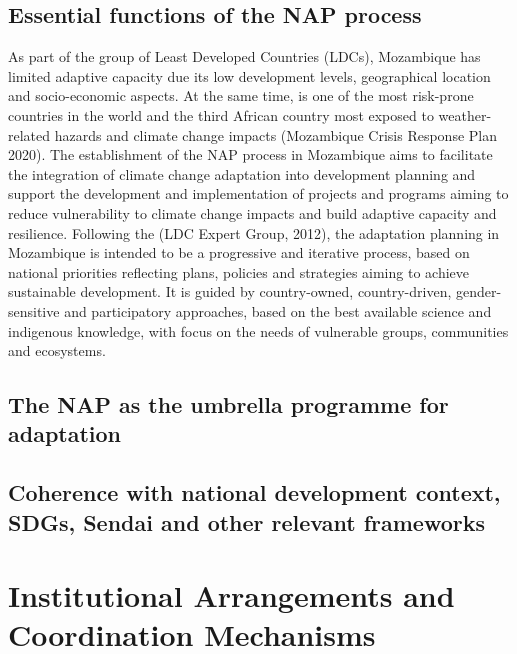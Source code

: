 \documentclass[
]{book}
\begin{document}
\hypertarget{essential-functions-of-the-nap-process}{%
\subsection{Essential functions of the NAP process}\label{essential-functions-of-the-nap-process}}

As part of the group of Least Developed Countries (LDCs), Mozambique has limited adaptive capacity due its low development levels, geographical location and socio-economic aspects. At the same time, is one of the most risk-prone countries in the world and the third African country most exposed to weather-related hazards and climate change impacts (Mozambique Crisis Response Plan 2020). The establishment of the NAP process in Mozambique aims to facilitate the integration of climate change adaptation into development planning and support the development and implementation of projects and programs aiming to reduce vulnerability to climate change impacts and build adaptive capacity and resilience. Following the (LDC Expert Group, 2012), the adaptation planning in Mozambique is intended to be a progressive and iterative process, based on national priorities reflecting plans, policies and strategies aiming to achieve sustainable development. It is guided by country-owned, country-driven, gender-sensitive and participatory approaches, based on the best available science and indigenous knowledge, with focus on the needs of vulnerable groups, communities and ecosystems.

\hypertarget{the-nap-as-the-umbrella-programme-for-adaptation}{%
\subsection{The NAP as the umbrella programme for adaptation}\label{the-nap-as-the-umbrella-programme-for-adaptation}}

\hypertarget{coherence-with-national-development-context-sdgs-sendai-and-other-relevant-frameworks}{%
\subsection{Coherence with national development context, SDGs, Sendai and other relevant frameworks}\label{coherence-with-national-development-context-sdgs-sendai-and-other-relevant-frameworks}}

\hypertarget{institutional-arrangements-and-coordination-mechanisms}{%
\section{Institutional Arrangements and Coordination Mechanisms}\label{institutional-arrangements-and-coordination-mechanisms}}
\end{document}
